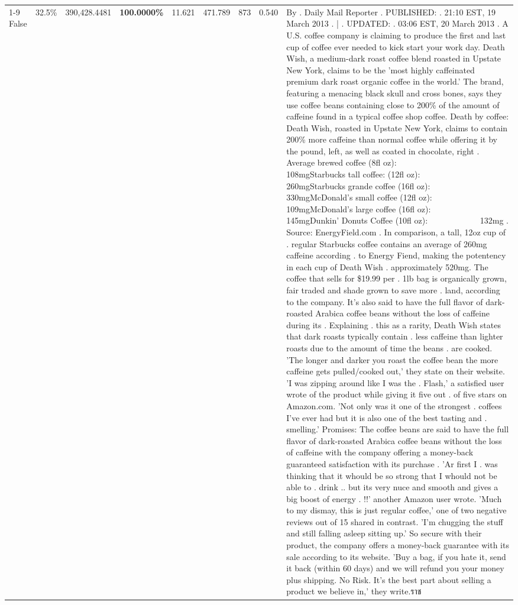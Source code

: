 \begin{table}[H]
{\begin{tabular}{lllrlllll}
\cline{1-9}
False & 32.5\% & 390,428.4481 & \bfseries \color{red} 100.0000\% & 11.621 & 471.789 & 873 & 0.540 & By . Daily Mail Reporter . PUBLISHED: . 21:10 EST, 19 March 2013 . | . UPDATED: . 03:06 EST, 20 March 2013 . A U.S. coffee company is claiming to produce the first and last cup of coffee ever needed to kick start your work day. Death Wish, a medium-dark roast coffee blend roasted in Upstate New York, claims to be the 'most highly caffeinated premium dark roast organic coffee in the world.' The brand, featuring a menacing black skull and cross bones, says they use coffee beans containing close to 200\% of the amount of caffeine found in a typical coffee shop coffee. Death by coffee: Death Wish, roasted in Upstate New York, claims to contain 200\% more caffeine than normal coffee while offering it by the pound, left, as well as coated in chocolate, right . Average brewed coffee (8fl oz):              108mgStarbucks tall coffee: (12fl oz):                260mgStarbucks grande coffee (16fl oz):         330mgMcDonald's small coffee (12fl oz):           109mgMcDonald's large coffee (16fl oz):           145mgDunkin' Donuts Coffee (10fl oz):             132mg . Source: EnergyField.com . In comparison, a tall, 12oz cup of . regular Starbucks coffee contains an average of 260mg caffeine according . to Energy Fiend, making the potentency in each cup of Death Wish . approximately 520mg. The coffee that sells for \$19.99 per . 1lb bag is organically grown, fair traded and shade grown to save more . land, according to the company. It's also said to have the full flavor of dark-roasted Arabica coffee beans without the loss of caffeine during its . Explaining . this as a rarity, Death Wish states that dark roasts typically contain . less caffeine than lighter roasts due to the amount of time the beans . are cooked. 'The longer and darker you roast the coffee bean the more caffeine gets pulled/cooked out,' they state on their website. 'I was zipping around like I was the . Flash,' a satisfied user wrote of the product while giving it five out . of five stars on Amazon.com. 'Not only was it one of the strongest . coffees I've ever had but it is also one of the best tasting and . smelling.’ Promises: The coffee beans are said to have the full flavor of dark-roasted Arabica coffee beans without the loss of caffeine with the company offering a money-back guaranteed satisfaction with its purchase . 'Ar first I . was thinking that it whould be so strong that I whould not be able to . drink .. but its very nuce and smooth and gives a big boost of energy . !!' another Amazon user wrote. 'Much to my dismay, this is just regular coffee,' one of two negative reviews out of 15 shared in contrast. 'I'm chugging the stuff and still falling asleep sitting up.' So secure with their product, the company offers a money-back guarantee with its sale according to its website. 'Buy a bag, if you hate it, send it back (within 60 days) and we will refund you your money plus shipping. No Risk. It’s the best part about selling a product we believe in,' they write.ราช \\

\end{tabular}}
\end{table}

